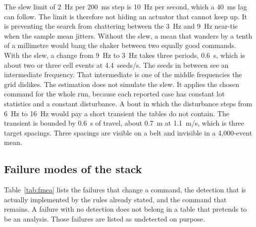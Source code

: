 The slew limit of 2~Hz per 200~ms step is 10~Hz per second, which a 40~ms lag can follow. The limit is therefore not hiding an actuator that cannot keep up. It is preventing the search from chattering between the 3~Hz and 9~Hz near-tie when the sample mean jitters. Without the slew, a mean that wanders by a tenth of a millimetre would bang the shaker between two equally good commands. With the slew, a change from 9~Hz to 3~Hz takes three periods, 0.6~s, which is about two or three cell events at 4.4~seeds/s. The seeds in between see an intermediate frequency. That intermediate is one of the middle frequencies the grid dislikes. The estimation does not simulate the slew. It applies the chosen command for the whole run, because each reported case has constant lot statistics and a constant disturbance. A bout in which the disturbance steps from 6~Hz to 16~Hz would pay a short transient the tables do not contain. The transient is bounded by 0.6~s of travel, about 0.7~m at 1.1~m/s, which is three target spacings. Three spacings are visible on a belt and invisible in a 4{,}000-event mean.

\subsection{Failure modes of the stack}

Table~\ref{tab:fmea} lists the failures that change a command, the detection that is actually implemented by the rules already stated, and the command that remains. A failure with no detection does not belong in a table that pretends to be an analysis. Those failures are listed as undetected on purpose.

